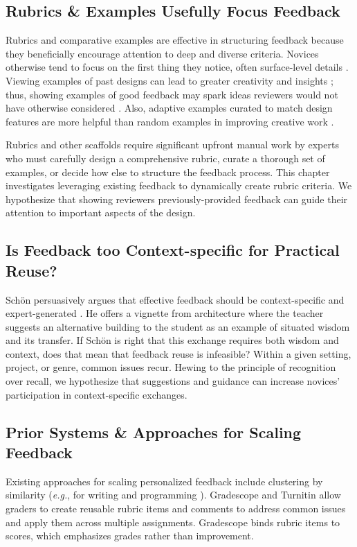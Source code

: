 \subsection{Rubrics \& Examples Usefully Focus Feedback}
Rubrics \cite{Andrade2005, Yuan2016} and comparative examples \cite{Krause2017} are effective in structuring feedback because they beneficially encourage attention to deep and diverse criteria. Novices otherwise tend to focus on the first thing they notice, often surface-level details \cite{Greenberg2015, Hicks2016, Kulkarni2015, Yuan2016}. Viewing examples of past designs can lead to greater creativity and insights \cite{Kulkarni2014, Marsh1996}; thus, showing examples of good feedback may spark ideas reviewers would not have otherwise considered \cite{Greenberg2015, Kulkarni2013, Luther2015}. Also, adaptive examples curated to match design features are more helpful than random examples in improving creative work \cite{Lee2010}. 

Rubrics and other scaffolds require significant upfront manual work by experts who must carefully design a comprehensive rubric, curate a thorough set of examples, or decide how else to structure the feedback process. This chapter investigates leveraging existing feedback to dynamically create rubric criteria. We hypothesize that showing reviewers previously-provided feedback can guide their attention to important aspects of the design. 
\subsection{Is Feedback too Context-specific for Practical Reuse?}
Schön persuasively argues that effective feedback should be context-specific and expert-generated \cite{Schon1983}. He offers a vignette from architecture where the teacher suggests an alternative building to the student as an example of situated wisdom and its transfer. If Schön is right that this exchange requires both wisdom and context, does that mean that feedback reuse is infeasible? Within a given setting, project, or genre, common issues recur. Hewing to the principle of recognition over recall, we hypothesize that suggestions and guidance can increase novices' participation in context-specific exchanges. 

\subsection{Prior Systems \& Approaches for Scaling Feedback}
Existing approaches for scaling personalized feedback include clustering by similarity (\textit{e.g.}, for writing \cite{Brooks2014} and programming \cite{Glassman2015, Head2017}). Gradescope \cite{Singh2017} and Turnitin \cite{Turnitin} allow graders to create reusable rubric items and comments to address common issues and apply them across multiple assignments. Gradescope binds rubric items to scores, which emphasizes grades rather than improvement. 

